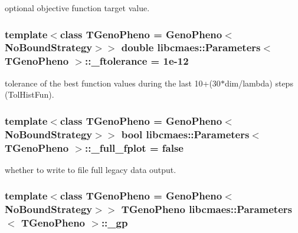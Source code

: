 optional objective function target value. \hypertarget{classlibcmaes_1_1Parameters_ab6c11cc112b5709e9039967e881c808e}{
\subsubsection[{\+\_\+ftolerance}]{\setlength{\rightskip}{0pt plus 5cm}template$<$class T\+Geno\+Pheno = Geno\+Pheno$<$\+No\+Bound\+Strategy$>$$>$ double {\bf libcmaes\+::\+Parameters}$<$ T\+Geno\+Pheno $>$\+::\+\_\+ftolerance = 1e-\/12\hspace{0.3cm}{\ttfamily [protected]}}}\label{classlibcmaes_1_1Parameters_ab6c11cc112b5709e9039967e881c808e}
tolerance of the best function values during the last 10+(30$\ast$dim/lambda) steps (Tol\+Hist\+Fun). \hypertarget{classlibcmaes_1_1Parameters_a00e08bf1e0de66bd07a1a4d0eb7c925f}{
\subsubsection[{\+\_\+full\+\_\+fplot}]{\setlength{\rightskip}{0pt plus 5cm}template$<$class T\+Geno\+Pheno = Geno\+Pheno$<$\+No\+Bound\+Strategy$>$$>$ bool {\bf libcmaes\+::\+Parameters}$<$ T\+Geno\+Pheno $>$\+::\+\_\+full\+\_\+fplot = false\hspace{0.3cm}{\ttfamily [protected]}}}\label{classlibcmaes_1_1Parameters_a00e08bf1e0de66bd07a1a4d0eb7c925f}
whether to write to file full legacy data output. \hypertarget{classlibcmaes_1_1Parameters_ab8e153b4785de9358599caa840b94ef2}{
\subsubsection[{\+\_\+gp}]{\setlength{\rightskip}{0pt plus 5cm}template$<$class T\+Geno\+Pheno = Geno\+Pheno$<$\+No\+Bound\+Strategy$>$$>$ T\+Geno\+Pheno {\bf libcmaes\+::\+Parameters}$<$ T\+Geno\+Pheno $>$\+::\+\_\+gp\hspace{0.3cm}{\ttfamily [protected]}}}\label{classlibcmaes_1_1Parameters_ab8e153b4785de9358599caa840b94ef2}
